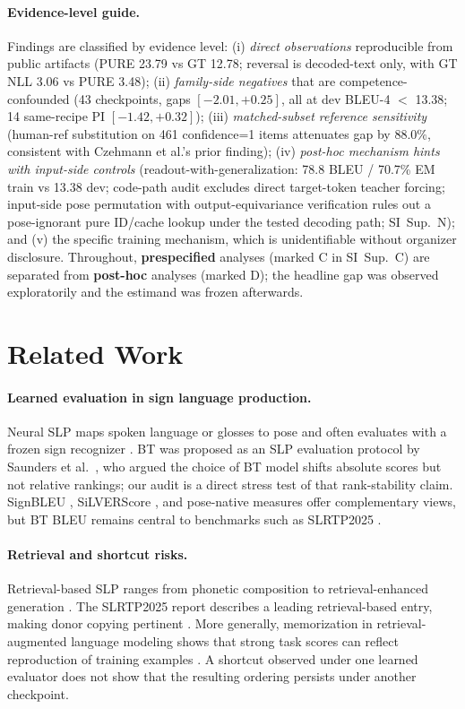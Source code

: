 \documentclass[pdflatex,sn-chicago]{sn-jnl}
\begin{document}
\paragraph{Evidence-level guide.}
Findings are classified by evidence level: (i) \emph{direct observations} reproducible from public artifacts (PURE 23.79 vs GT 12.78; reversal is decoded-text only, with GT NLL 3.06 vs PURE 3.48); (ii) \emph{family-side negatives} that are competence-confounded (43 checkpoints, gaps $[-2.01,+0.25]$, all at dev BLEU-4 $<$ 13.38; 14 same-recipe PI $[-1.42, +0.32]$); (iii) \emph{matched-subset reference sensitivity} (human-ref substitution on 461 confidence=1 items attenuates gap by $88.0\%$, consistent with Czehmann et al.'s prior finding); (iv) \emph{post-hoc mechanism hints with input-side controls} (readout-with-generalization: 78.8 BLEU / 70.7\% EM train vs 13.38 dev; code-path audit excludes direct target-token teacher forcing; input-side pose permutation with output-equivariance verification rules out a pose-ignorant pure ID/cache lookup under the tested decoding path; SI~Sup.~N); and (v) the specific training mechanism, which is unidentifiable without organizer disclosure. Throughout, \textbf{prespecified} analyses (marked C in SI~Sup.~C) are separated from \textbf{post-hoc} analyses (marked D); the headline gap was observed exploratorily and the estimand was frozen afterwards.


\section{Related Work}

\paragraph{Learned evaluation in sign language production.}
Neural SLP maps spoken language or glosses to pose and often evaluates with a frozen sign recognizer \cite{camgoz2018neural,saunders2020progressive}. BT was proposed as an SLP evaluation protocol by Saunders et al.~\cite{saunders2021continuous}, who argued the choice of BT model shifts absolute scores but not relative rankings; our audit is a direct stress test of that rank-stability claim. SignBLEU \cite{signbleu}, SiLVERScore \cite{silverscore}, and pose-native measures offer complementary views, but BT BLEU remains central to benchmarks such as SLRTP2025 \cite{slrtp2025}.

\paragraph{Retrieval and shortcut risks.}
Retrieval-based SLP ranges from phonetic composition to retrieval-enhanced generation \cite{walsh2024datadriven,signstitching,soke,darslp}. The SLRTP2025 report describes a leading retrieval-based entry, making donor copying pertinent \cite{slrtp2025}. More generally, memorization in retrieval-augmented language modeling shows that strong task scores can reflect reproduction of training examples \cite{carlini2021extracting,kandpal2022memorization,khandelwal2020knnlm}. A shortcut observed under one learned evaluator does not show that the resulting ordering persists under another checkpoint.
\end{document}
